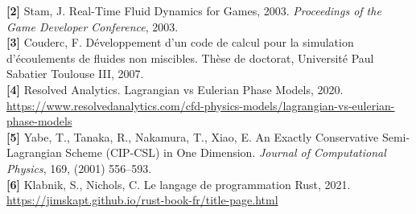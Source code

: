 \documentclass{article}
\begin{document}
\textbf{[2]} Stam, J. Real-Time Fluid Dynamics for Games, 2003. \textit{Proceedings of the Game Developer Conference}, 2003.\\

\textbf{[3]} Couderc, F. Développement d'un code de calcul pour la simulation d'écoulements de fluides non miscibles. Thèse de doctorat, Université Paul Sabatier Toulouse III, 2007.\\

\textbf{[4]} Resolved Analytics. Lagrangian vs Eulerian Phase Models, 2020. \url{https://www.resolvedanalytics.com/cfd-physics-models/lagrangian-vs-eulerian-phase-models}\\

\textbf{[5]} Yabe, T., Tanaka, R., Nakamura, T., Xiao, E. An Exactly Conservative Semi-Lagrangian Scheme (CIP-CSL) in One Dimension. \textit{Journal of Computational Physics}, 169, (2001) 556--593.\\

\textbf{[6]} Klabnik, S., Nichols, C. Le langage de programmation Rust, 2021. \url{https://jimskapt.github.io/rust-book-fr/title-page.html}\\
\end{document}
